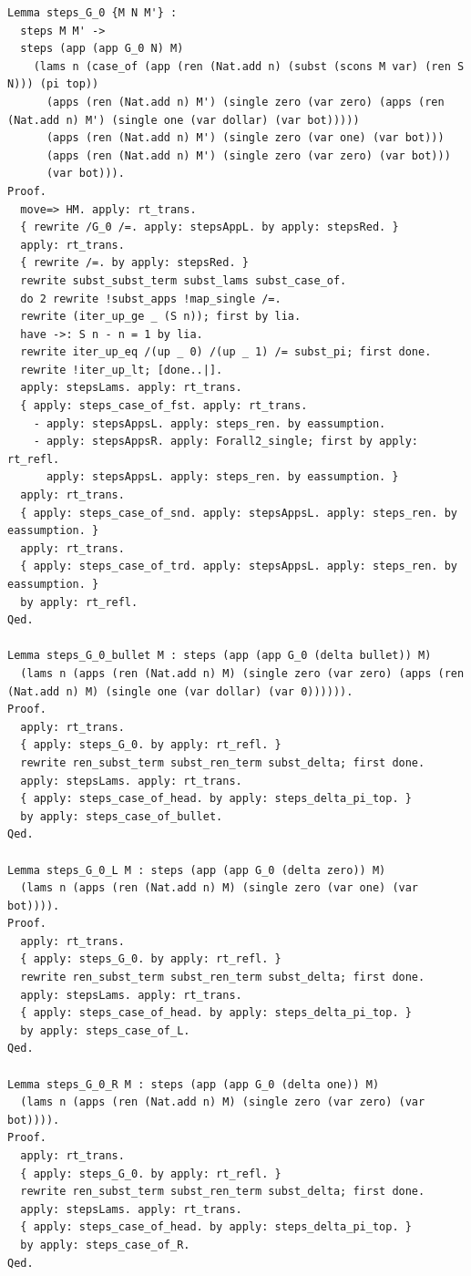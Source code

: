 \documentclass[10pt,a4paper]{amsart}
\begin{document}
\begin{lstlisting}
Lemma steps_G_0 {M N M'} :
  steps M M' ->
  steps (app (app G_0 N) M)
    (lams n (case_of (app (ren (Nat.add n) (subst (scons M var) (ren S N))) (pi top))
      (apps (ren (Nat.add n) M') (single zero (var zero) (apps (ren (Nat.add n) M') (single one (var dollar) (var bot)))))
      (apps (ren (Nat.add n) M') (single zero (var one) (var bot)))
      (apps (ren (Nat.add n) M') (single zero (var zero) (var bot)))
      (var bot))).
Proof.
  move=> HM. apply: rt_trans.
  { rewrite /G_0 /=. apply: stepsAppL. by apply: stepsRed. }
  apply: rt_trans.
  { rewrite /=. by apply: stepsRed. }
  rewrite subst_subst_term subst_lams subst_case_of.
  do 2 rewrite !subst_apps !map_single /=.
  rewrite (iter_up_ge _ (S n)); first by lia.
  have ->: S n - n = 1 by lia.
  rewrite iter_up_eq /(up _ 0) /(up _ 1) /= subst_pi; first done.
  rewrite !iter_up_lt; [done..|].
  apply: stepsLams. apply: rt_trans.
  { apply: steps_case_of_fst. apply: rt_trans.
    - apply: stepsAppsL. apply: steps_ren. by eassumption.
    - apply: stepsAppsR. apply: Forall2_single; first by apply: rt_refl.
      apply: stepsAppsL. apply: steps_ren. by eassumption. }
  apply: rt_trans.
  { apply: steps_case_of_snd. apply: stepsAppsL. apply: steps_ren. by eassumption. }
  apply: rt_trans.
  { apply: steps_case_of_trd. apply: stepsAppsL. apply: steps_ren. by eassumption. }
  by apply: rt_refl.
Qed.

Lemma steps_G_0_bullet M : steps (app (app G_0 (delta bullet)) M)
  (lams n (apps (ren (Nat.add n) M) (single zero (var zero) (apps (ren (Nat.add n) M) (single one (var dollar) (var 0)))))).
Proof.
  apply: rt_trans.
  { apply: steps_G_0. by apply: rt_refl. }
  rewrite ren_subst_term subst_ren_term subst_delta; first done.
  apply: stepsLams. apply: rt_trans.
  { apply: steps_case_of_head. by apply: steps_delta_pi_top. }
  by apply: steps_case_of_bullet.
Qed.

Lemma steps_G_0_L M : steps (app (app G_0 (delta zero)) M)
  (lams n (apps (ren (Nat.add n) M) (single zero (var one) (var bot)))).
Proof.
  apply: rt_trans.
  { apply: steps_G_0. by apply: rt_refl. }
  rewrite ren_subst_term subst_ren_term subst_delta; first done.
  apply: stepsLams. apply: rt_trans.
  { apply: steps_case_of_head. by apply: steps_delta_pi_top. }
  by apply: steps_case_of_L.
Qed.

Lemma steps_G_0_R M : steps (app (app G_0 (delta one)) M)
  (lams n (apps (ren (Nat.add n) M) (single zero (var zero) (var bot)))).
Proof.
  apply: rt_trans.
  { apply: steps_G_0. by apply: rt_refl. }
  rewrite ren_subst_term subst_ren_term subst_delta; first done.
  apply: stepsLams. apply: rt_trans.
  { apply: steps_case_of_head. by apply: steps_delta_pi_top. }
  by apply: steps_case_of_R.
Qed.


\end{lstlisting}
\end{document}
